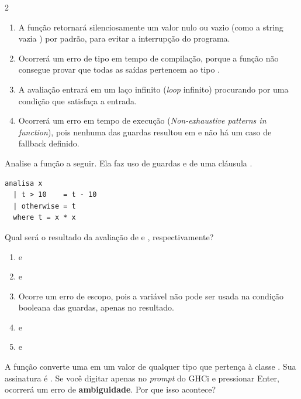 \documentclass[a4paper,10pt,brazil]{article}
\begin{document}
\begin{multicols}{2}
\begin{enumerate}
  \item A função retornará silenciosamente um valor nulo ou vazio (como a string vazia ) por padrão, para evitar a interrupção do programa.

  \item Ocorrerá um erro de tipo em tempo de compilação, porque a função não consegue provar que todas as saídas pertencem ao tipo .

  \item A avaliação entrará em um laço infinito (\emph{loop} infinito) procurando por uma condição que satisfaça a entrada.

  \item Ocorrerá um erro em tempo de execução (\emph{Non-exhaustive patterns in function}), pois nenhuma das guardas resultou em  e não há um caso de fallback definido.


\end{enumerate}

Analise a função a seguir. Ela faz uso de guardas e de uma cláusula .

\begin{verbatim}
analisa x
  | t > 10    = t - 10
  | otherwise = t
  where t = x * x
\end{verbatim}

Qual será o resultado da avaliação de  e , respectivamente?

\begin{enumerate}
  \item {} e 

  \item {} e 

  \item Ocorre um erro de escopo, pois a variável  não pode ser usada na condição booleana das guardas, apenas no resultado.

  \item {} e 

  \item {} e 


\end{enumerate}

A função  converte uma  em um valor de qualquer tipo que pertença à classe . Sua assinatura é . 
Se você digitar apenas  no \emph{prompt} do GHCi e pressionar Enter, ocorrerá um erro de \textbf{ambiguidade}. Por que isso acontece?


\end{multicols}
\end{document}
